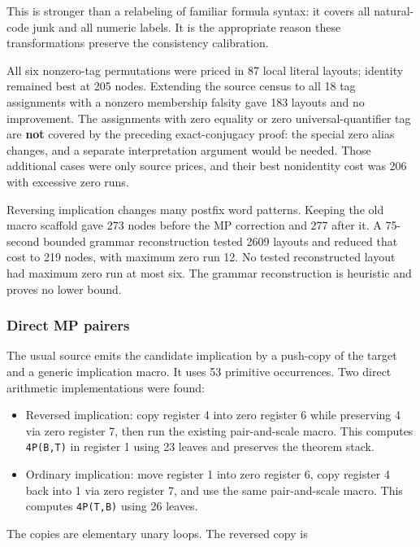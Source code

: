 \documentclass[
  11pt,
]{article}
\providecommand{\tightlist}{%
  \setlength{\itemsep}{0pt}\setlength{\parskip}{0pt}}
\begin{document}
This is stronger than a relabeling of familiar formula syntax: it covers
all natural-code junk and all numeric labels. It is the appropriate
reason these transformations preserve the consistency calibration.

All six nonzero-tag permutations were priced in 87 local literal
layouts; identity remained best at 205 nodes. Extending the source
census to all 18 tag assignments with a nonzero membership falsity gave
183 layouts and no improvement. The assignments with zero equality or
zero universal-quantifier tag are \textbf{not} covered by the preceding
exact-conjugacy proof: the special zero alias changes, and a separate
interpretation argument would be needed. Those additional cases were
only source prices, and their best nonidentity cost was 206 with
excessive zero runs.

Reversing implication changes many postfix word patterns. Keeping the
old macro scaffold gave 273 nodes before the MP correction and 277 after
it. A 75-second bounded grammar reconstruction tested 2609 layouts and
reduced that cost to 219 nodes, with maximum zero run 12. No tested
reconstructed layout had maximum zero run at most six. The grammar
reconstruction is heuristic and proves no lower bound.

\hypertarget{direct-mp-pairers}{%
\subsubsection{Direct MP pairers}\label{direct-mp-pairers}}

The usual source emits the candidate implication by a push-copy of the
target and a generic implication macro. It uses 53 primitive
occurrences. Two direct arithmetic implementations were found:

\begin{itemize}
\tightlist
\item
  Reversed implication: copy register 4 into zero register 6 while
  preserving 4 via zero register 7, then run the existing pair-and-scale
  macro. This computes \texttt{4P(B,T)} in register 1 using 23 leaves
  and preserves the theorem stack.
\item
  Ordinary implication: move register 1 into zero register 6, copy
  register 4 back into 1 via zero register 7, and use the same
  pair-and-scale macro. This computes \texttt{4P(T,B)} using 26 leaves.
\end{itemize}

The copies are elementary unary loops. The reversed copy is
\end{document}
